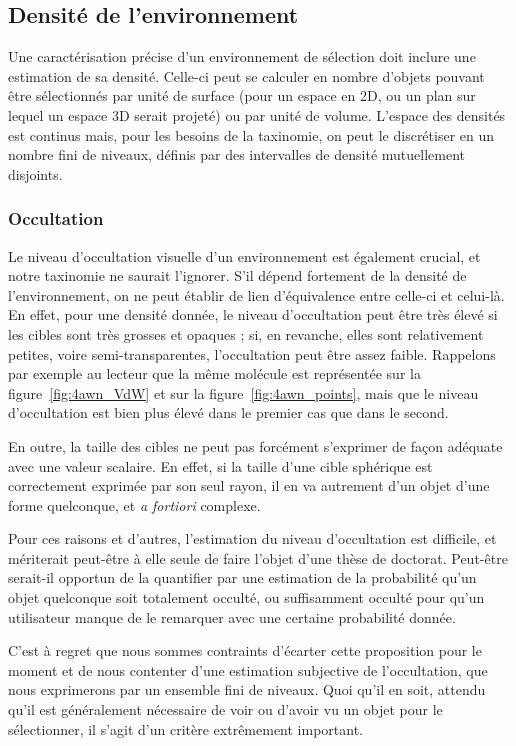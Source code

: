     \subsection{Densité de l'environnement}
    Une caractérisation précise d'un environnement de sélection doit inclure une estimation de sa densité. Celle-ci peut se calculer en nombre d'objets pouvant être sélectionnés par unité de surface (pour un espace en 2D, ou un plan sur lequel un espace 3D serait projeté) ou par unité de volume. L'espace des densités est continus mais, pour les besoins de la taxinomie, on peut le discrétiser en un nombre fini de niveaux, définis par des intervalles de densité mutuellement disjoints.
    
    \subsubsection{Occultation}
    Le niveau d'occultation visuelle d'un environnement est également crucial, et notre taxinomie ne saurait l'ignorer. S'il dépend fortement de la densité de l'environnement, on ne peut établir de lien d'équivalence entre celle-ci et celui-là. En effet, pour une densité donnée, le niveau d'occultation peut être très élevé si les cibles sont très grosses et opaques ; si, en revanche, elles sont relativement petites, voire semi-transparentes, l'occultation peut être assez faible. Rappelons par exemple au lecteur que la même molécule est représentée sur la figure~\ref{fig:4awn_VdW} et sur la figure~\ref{fig:4awn_points}, mais que le niveau d'occultation est bien plus élevé dans le premier cas que dans le second.
	
    En outre, la \og taille \fg{} des cibles ne peut pas forcément s'exprimer de façon adéquate avec une valeur scalaire. En effet, si la taille d'une cible sphérique est correctement exprimée par son seul rayon, il en va autrement d'un objet d'une forme quelconque, et \emph{a fortiori} complexe.
    
    Pour ces raisons et d'autres, l'estimation du niveau d'occultation est difficile, et mériterait peut-être à elle seule de faire l'objet d'une thèse de doctorat. Peut-être serait-il opportun de la quantifier par une estimation de la probabilité qu'un objet quelconque soit totalement occulté, ou suffisamment occulté pour qu'un utilisateur manque de le remarquer avec une certaine probabilité donnée.
    
    C'est à regret que nous sommes contraints d'écarter cette proposition pour le moment et de nous contenter d'une estimation subjective de l'occultation, que nous exprimerons par un ensemble fini de niveaux. Quoi qu'il en soit, attendu qu'il est généralement nécessaire de voir ou d'avoir vu un objet pour le sélectionner, il s'agit d'un critère extrêmement important.


